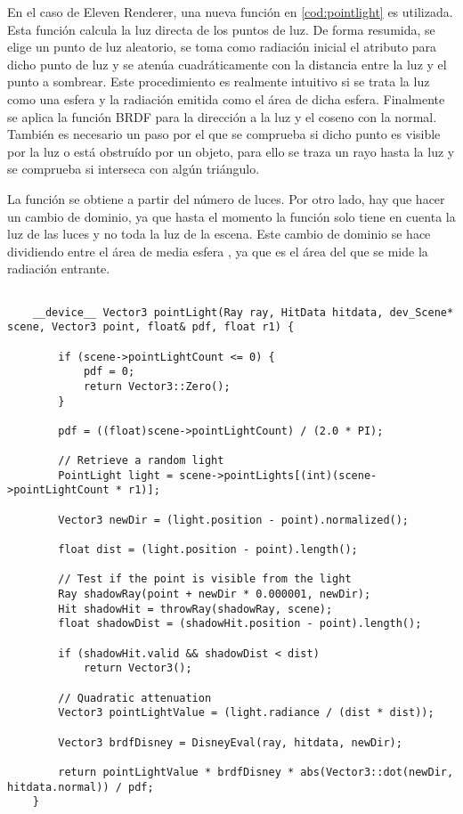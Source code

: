 En el caso de Eleven Renderer, una nueva función  en \autoref{cod:pointlight} es utilizada. Esta función calcula la luz directa de los puntos de luz. De forma resumida, se elige un punto de luz aleatorio, se toma como radiación inicial el atributo  para dicho punto de luz y se atenúa cuadráticamente con la distancia entre la luz y el punto a sombrear. Este procedimiento es realmente intuitivo si se trata la luz como una esfera y la radiación emitida como el área de dicha esfera. Finalmente se aplica la función BRDF para la dirección a la luz y el coseno con la normal. También es necesario un paso por el que se comprueba si dicho punto es visible por la luz o está obstruído por un objeto, para ello se traza un rayo hasta la luz y se comprueba si interseca con algún triángulo.

La función  se obtiene a partir del número de luces. Por otro lado, hay que hacer un cambio de dominio, ya que hasta el momento la función  solo tiene en cuenta la luz de las luces y no toda la luz de la escena. Este cambio de dominio se hace dividiendo entre el área de media esfera , ya que es el área del que se mide la radiación entrante.

\begin{minipage}[c]{0.95\textwidth}
\begin{lstlisting}[label={cod:pointlight}, caption={Código de iluminación por luces puntuales}]
	
	__device__ Vector3 pointLight(Ray ray, HitData hitdata, dev_Scene* scene, Vector3 point, float& pdf, float r1) {

		if (scene->pointLightCount <= 0) {
			pdf = 0;
			return Vector3::Zero();
		}

		pdf = ((float)scene->pointLightCount) / (2.0 * PI);

		// Retrieve a random light
		PointLight light = scene->pointLights[(int)(scene->pointLightCount * r1)];
		
		Vector3 newDir = (light.position - point).normalized();
		
		float dist = (light.position - point).length();

		// Test if the point is visible from the light
		Ray shadowRay(point + newDir * 0.000001, newDir);
		Hit shadowHit = throwRay(shadowRay, scene);
		float shadowDist = (shadowHit.position - point).length();

		if (shadowHit.valid && shadowDist < dist)
			return Vector3();

		// Quadratic attenuation
		Vector3 pointLightValue = (light.radiance / (dist * dist));

		Vector3 brdfDisney = DisneyEval(ray, hitdata, newDir);

		return pointLightValue * brdfDisney * abs(Vector3::dot(newDir, hitdata.normal)) / pdf;
	}
	
\end{lstlisting}
\end{minipage}

